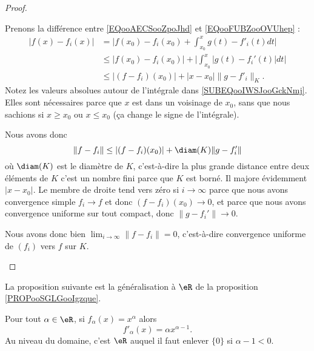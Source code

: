 \begin{normaltext}
\begin{proof}
\begin{subproof}
        Prenons la différence entre \eqref{EQooAECSooZpoJhd} et \eqref{EQooFUBZooOVUhep} :
        \begin{subequations}
            \begin{align}
                | f(x)-f_i(x) |&=\big| f(x_0)-f_i(x_0)+\int_{x_0}^x g(t)-f'_i(t)dt \big|\\
                &\leq | f(x_0)-f_i(x_0) |+\Big| \int_{x_0}^x| g(t)-f_i'(t) |dt  \Big|       \label{SUBEQooIWSJooGckNmj}\\
                &\leq | (f-f_i)(x_0) |+| x-x_0 |\| g-f'_i \|_K.
            \end{align}
        \end{subequations}
        Notez les valeurs absolues autour de l'intégrale dans \eqref{SUBEQooIWSJooGckNmj}. Elles sont nécessaires parce que \( x\) est dans un voisinage de \( x_0\), sans que nous sachions si \( x\geq x_0\) ou \( x\leq x_0\) (ça change le signe de l'intégrale).

        Nous avons donc
        \begin{equation}
            \| f-f_i \|\leq | (f-f_i)(x_0) |+\diam(K)\| g-f'_i \|
        \end{equation}
        où \( \diam(K)\) est le diamètre de \( K\), c'est-à-dire la plus grande distance entre deux éléments de \( K\) c'est un nombre fini parce que \( K\) est borné. Il majore évidemment \( | x-x_0 |\). Le membre de droite tend vers zéro si \( i\to \infty\) parce que nous avons convergence simple \( f_i\to f\) et donc \( (f-f_i)(x_0)\to 0\), et parce que nous avons convergence uniforme sur tout compact, donc \( \| g-f_i' \|\to 0\).

        Nous avons donc bien \( \lim_{i\to \infty}\| f-f_i \|=0\), c'est-à-dire convergence uniforme de \( (f_i)\) vers \( f\) sur \( K\).

        \end{subproof}
    \end{proof}
\end{normaltext}

La proposition suivante est la généralisation à \( \eR\) de la proposition \ref{PROPooSGLGooIgzque}.
\begin{proposition}     \label{PROPooKIASooGngEDh}
    Pour tout \( \alpha\in \eR\), si \( f_{\alpha}(x)=x^{\alpha}\) alors
    \begin{equation}
        f'_{\alpha}(x)=\alpha x^{\alpha-1}.
    \end{equation}
    Au niveau du domaine, c'est \( \eR\) auquel il faut enlever \( \{ 0 \}\) si \( \alpha-1<0\).
\end{proposition}

